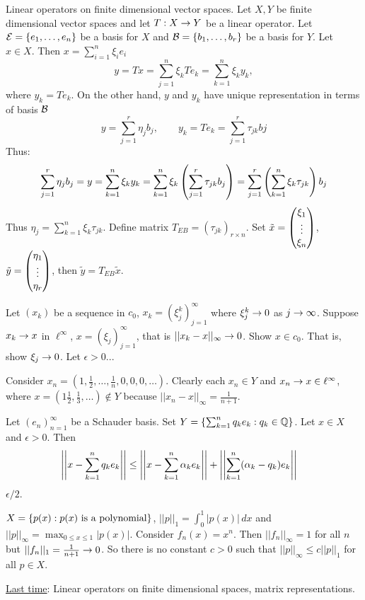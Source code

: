 \documentclass[]{article}
\begin{document}
Linear operators on finite dimensional vector spaces. 
Let $X,Y$ be finite dimensional vector spaces and let $T:X\rightarrow Y$ be a linear operator.
Let $\mathcal{E}=\left\{ e_1,\dots,e_n \right\}$ be a basis for $X$ and $\mathcal{B} = \left\{ b_1,\dots,b_r \right\}$ be a basis for $Y$.
Let $x\in X$. Then $x = \sum_{i=1}^n \xi_ie_i$
$$ y = Tx = \sum_{j=1}^n \xi_k Te_k = \sum_{k=1}^n \xi_ky_k, $$
where $y_k= Te_k$.
On the other hand, $y$ and $y_k$ have unique representation in terms of basis $\mathcal{B}$
$$ y = \sum_{j=1}^r \eta_jb_j, \qquad y_k = Te_k = \sum_{j=1}^r \tau_{jk}bj $$
Thus:
\begin{align*}
	\sum_{j=1}^r \eta_jb_j = y = \sum_{k=1}^n \xi_ky_k 
						= \sum_{k=1}^n \xi_k\left(\sum_{j=1}^r \tau_{jk}b_j\right) 
						= \sum_{j=1}^r \left(\sum_{k=1}^n \xi_k\tau_{jk}\right)b_j
\end{align*}
Thus $\eta_j = \sum_{k=1}^n \xi_k\tau_{jk}$.
Define matrix $T_{EB} = (\tau_{jk})_{r\times n}$.
Set $\tilde x = \begin{pmatrix}\xi_1\\\vdots\\\xi_n\end{pmatrix}$, $\tilde y = \begin{pmatrix}\eta_1\\\vdots\\\eta_r\end{pmatrix}$, then $\tilde y = T_{EB}\tilde x$.

\begin{example}
	[2.3-2] Let $(x_k)$ be a sequence in $c_0$, $x_k=(\xi_j^k)_{j=1}^\infty$ where $\xi_j^k\rightarrow0$ as $j\rightarrow\infty$.
	Suppose $x_k\rightarrow x$ in $\ell^\infty$, $x=(\xi_j)_{j=1}^\infty$, that is $||x_k-x||_\infty\rightarrow0$.
	Show $x\in c_0$. That is, show $\xi_j\rightarrow 0$.
	Let $\epsilon >0$...
\end{example}
\begin{example}
	[2.3-3]
	Consider $x_n = (1,\frac12,\dots,\frac1n,0,0,0,\dots)$.
	Clearly each $x_n\in Y$ and $x_n\rightarrow x\in\ell^\infty$, where $x = (1\frac12,\frac13,\dots)\notin Y$ because $||x_n-x||_\infty = \frac1{n+1}$.
\end{example}
\begin{example}
	[2.3-10] Let $(e_n)_{n=1}^\infty$ be a Schauder basis.
	Set $Y = \left\{ \sum_{k=1}^n q_ke_k : q_k\in\mathbb{Q} \right\}$. Let $x\in X$ and $\epsilon>0$.
	Then 
	\begin{align*}
		\left|\left|x-\sum_{k=1}^nq_ke_k\right|\right| &\leq \left|\left|x-\sum_{k=1}^n \alpha_ke_k\right|\right| + \left|\left|\sum_{k=1}^n(\alpha_k-q_k)e_k\right|\right|
	\end{align*}
	$\epsilon/2$.
\end{example}

\begin{example}
	[Test \#5] $X = \left\{ p(x) : p(x)\text{ is a polynomial} \right\}$, $||p||_1 = \int_0^1 |p(x)|\,dx$ and $||p||_\infty = \max_{0\leq x\leq1}|p(x)|$.
	Consider $f_n(x) = x^n$. Then $||f_n||_\infty=1$ for all $n$ but $||f_n||_1 = \frac1{n+1}\rightarrow0$.
	So there is no constant $c>0$ such that $||p||_\infty\leq c||p||_1$ for all $p\in X$.
\end{example}
\newpage
\ul{Last time}: Linear operators on finite dimensional spaces, matrix representations.
\end{document}
